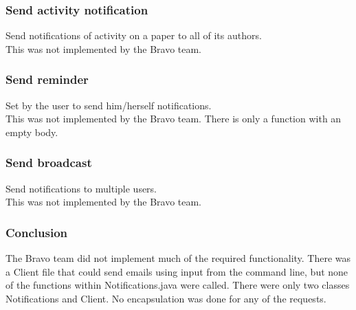 \subsubsection*{Send activity notification}
Send notifications of activity on a paper to all of its authors.\\
This was not implemented by the Bravo team.

\subsubsection*{Send reminder}
Set by the user to send him/herself notifications.\\
This was not implemented by the Bravo team. There is only a function with an empty body.

\subsubsection*{Send broadcast}
Send notifications to multiple users.\\
This was not implemented by the Bravo team.

\subsubsection*{Conclusion}
The Bravo team did not implement much of the required functionality. There was a Client file that could send emails using input from the command line, but none of the functions within Notifications.java were called. There were only two classes Notifications and Client. No encapsulation was done for any of the requests.

